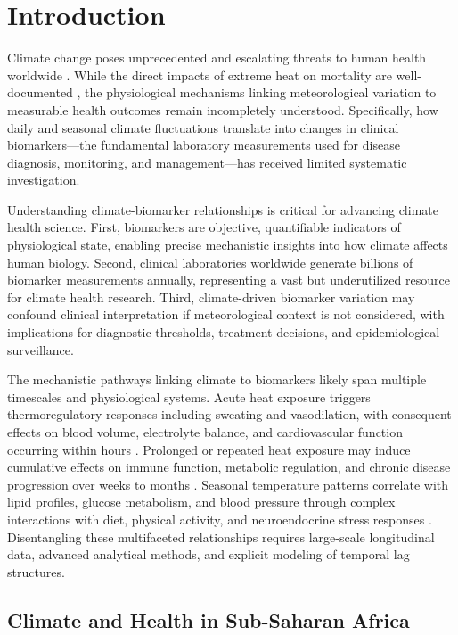 \section{Introduction}

Climate change poses unprecedented and escalating threats to human health worldwide \citep{watts2021lancet}. While the direct impacts of extreme heat on mortality are well-documented \citep{guo2014quantifying, gasparrini2015mortality}, the physiological mechanisms linking meteorological variation to measurable health outcomes remain incompletely understood. Specifically, how daily and seasonal climate fluctuations translate into changes in clinical biomarkers---the fundamental laboratory measurements used for disease diagnosis, monitoring, and management---has received limited systematic investigation.

Understanding climate-biomarker relationships is critical for advancing climate health science. First, biomarkers are objective, quantifiable indicators of physiological state, enabling precise mechanistic insights into how climate affects human biology. Second, clinical laboratories worldwide generate billions of biomarker measurements annually, representing a vast but underutilized resource for climate health research. Third, climate-driven biomarker variation may confound clinical interpretation if meteorological context is not considered, with implications for diagnostic thresholds, treatment decisions, and epidemiological surveillance.

The mechanistic pathways linking climate to biomarkers likely span multiple timescales and physiological systems. Acute heat exposure triggers thermoregulatory responses including sweating and vasodilation, with consequent effects on blood volume, electrolyte balance, and cardiovascular function occurring within hours \citep{cheuvront2010mechanisms}. Prolonged or repeated heat exposure may induce cumulative effects on immune function, metabolic regulation, and chronic disease progression over weeks to months \citep{armstrong2014models}. Seasonal temperature patterns correlate with lipid profiles, glucose metabolism, and blood pressure through complex interactions with diet, physical activity, and neuroendocrine stress responses \citep{ockene1990seasonal}. Disentangling these multifaceted relationships requires large-scale longitudinal data, advanced analytical methods, and explicit modeling of temporal lag structures.

\subsection{Climate and Health in Sub-Saharan Africa}

